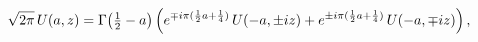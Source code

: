 \[\sqrt{2\pi}\mathop{U\/}\nolimits\!\left(a,z\right)=\mathop{\Gamma\/}\nolimits%
\!\left(\tfrac{1}{2}-a\right)\left(e^{\mp i\pi(\frac{1}{2}a+\frac{1}{4})}%
\mathop{U\/}\nolimits\!\left(-a,\pm iz\right)+e^{\pm i\pi(\frac{1}{2}a+\frac{1%
}{4})}\mathop{U\/}\nolimits\!\left(-a,\mp iz\right)\right),\]